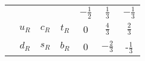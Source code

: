 \begin{table}
\begin{tabular}{c |@{}| c c c | c c c}
                                 &                                         &                                             &                                               & $-\frac{1}{2}$ & $\frac{1}{3}$  & $-\frac{1}{3}$ \\
                                 & $u_R$                                   & $ c_R$                                      & $t_R$                                         & 0              & $\frac{4}{3}$  & $\frac{2}{3}$  \\
                                 & $d_R$                                   & $ s_R$                                      & $b_R$                                         & 0              & $-\frac{2}{3}$ & -$\frac{1}{3}$ \\
        \bottomrule
      \end{tabular}
  \end{table}


